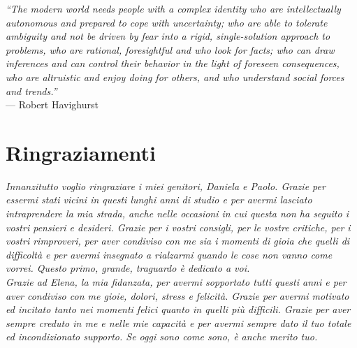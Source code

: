 
\cleardoublepage
{}
{}

\begin{small}
\begin{flushright}{
	\slshape    
	``The modern world needs people with a complex identity who are intellectually autonomous and prepared to cope with uncertainty; who are able to tolerate ambiguity and not be driven by fear into a rigid, single-solution approach to problems, who are rational, foresightful and who look for facts; who can draw inferences and can control their behavior in the light of foreseen consequences, who are altruistic and enjoy doing for others, and who understand social forces and trends.''} \\ 
	\medskip
    --- Robert Havighurst
\end{flushright}
\end{small}

\begingroup
\let\clearpage\relax
\let\cleardoublepage\relax
\let\cleardoublepage\relax

\chapter*{Ringraziamenti}

\noindent \textit{Innanzitutto voglio ringraziare i miei genitori, Daniela e Paolo. Grazie per essermi stati vicini in questi lunghi anni di studio e per avermi lasciato intraprendere la mia strada, anche nelle occasioni in cui questa non ha seguito i vostri pensieri e desideri. Grazie per i vostri consigli, per le vostre critiche, per i vostri rimproveri, per aver condiviso con me sia i momenti di gioia che quelli di difficoltà e per avermi insegnato a rialzarmi quando le cose non vanno come vorrei. Questo primo, grande, traguardo è dedicato a voi.}\\

\noindent \textit{Grazie ad Elena, la mia fidanzata, per avermi sopportato tutti questi anni e per aver condiviso con me gioie, dolori, stress e felicità. Grazie per avermi motivato ed incitato tanto nei momenti felici quanto in quelli più difficili. Grazie per aver sempre creduto in me e nelle mie capacità e per avermi sempre dato il tuo totale ed incondizionato supporto. Se oggi sono come sono, è anche merito tuo.}\\

